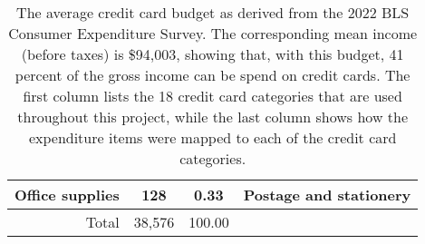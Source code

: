 \begin{table}[t!bh]
\begin{tabular}{ r c c l}
        Office supplies & 128 &	0.33 & Postage and stationery \\
        \hline
        \hline
        Total & 38,576	& 100.00 & \\
    \end{tabular}
    \caption{The average credit card budget as derived from the 2022 BLS Consumer Expenditure Survey. The corresponding mean income (before taxes) is \$94,003, showing that, with this budget, 41 percent of the gross income can be spend on credit cards. The first column lists the 18 credit card categories that are used throughout this project, while the last column shows how the expenditure items were mapped to each of the credit card categories.}
    \label{tab:BudgetExtended}
\end{table}

